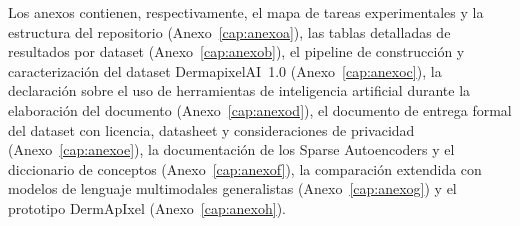 Los anexos contienen, respectivamente, el mapa de tareas
experimentales y la estructura del repositorio
(Anexo~\ref{cap:anexoa}), las tablas detalladas de resultados por
dataset (Anexo~\ref{cap:anexob}), el pipeline de construcción y
caracterización del dataset DermapixelAI~1.0
(Anexo~\ref{cap:anexoc}), la declaración sobre el uso de
herramientas de inteligencia artificial durante la elaboración del
documento (Anexo~\ref{cap:anexod}), el documento de entrega formal
del dataset con licencia, datasheet y consideraciones de privacidad
(Anexo~\ref{cap:anexoe}), la documentación de los Sparse
Autoencoders y el diccionario de conceptos
(Anexo~\ref{cap:anexof}), la comparación extendida con modelos
de lenguaje multimodales generalistas (Anexo~\ref{cap:anexog}) y
el prototipo DermApIxel (Anexo~\ref{cap:anexoh}).
